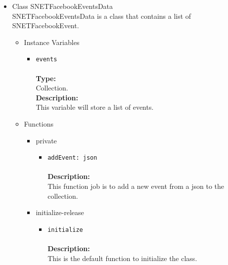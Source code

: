 \begin{itemize}
\begin{itemize}
\begin{itemize}
\end{itemize} %
\end{itemize} %

\item Class SNETFacebookEventsData\\
\label{sec-1-4-2-12}%
SNETFacebookEventsData is a class that contains a list of SNETFacebookEvent.

\begin{itemize}

\item Instance Variables
\label{sec-1-4-2-12-1}%
\begin{itemize}
\item \verb~events~\\\\
\textbf{Type:}\\
     Collection.\\

     \textbf{Description:}\\
     This variable will store a list of events.
\end{itemize}


\item Functions
\label{sec-1-4-2-12-2}%
\begin{itemize}

\item private
\label{sec-1-4-2-12-2-1}%
\begin{itemize}
\item \verb~addEvent: json~\\\\
\textbf{Description:}\\
      This function job is to add a new event from a json to the collection.\\
\end{itemize}


\item initialize-release
\label{sec-1-4-2-12-2-2}%
\begin{itemize}
\item \verb~initialize~\\\\
\textbf{Description:}\\
      This is the default function to initialize the class.
\end{itemize}



\end{itemize}
\end{itemize}
\end{itemize}
